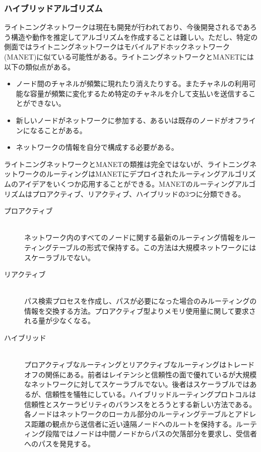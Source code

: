 \documentclass[12pt]{jarticle}
\begin{document}
\subsubsection{ハイブリッドアルゴリズム}
ライトニングネットワークは現在も開発が行われており、今後開発されるであろう構造や動作を推定してアルゴリズムを作成することは難しい。ただし、特定の側面ではライトニングネットワークはモバイルアドホックネットワーク(MANET)に似ている可能性がある。ライトニングネットワークとMANETには以下の類似点がある。
\begin{itemize}
\item ノード間のチャネルが頻繁に現れたり消えたりする。またチャネルの利用可能な容量が頻繁に変化するため特定のチャネルを介して支払いを送信することができない。
\item 新しいノードがネットワークに参加する、あるいは既存のノードがオフラインになることがある。
\item ネットワークの情報を自分で構成する必要がある。
\end{itemize}

ライトニングネットワークとMANETの類推は完全ではないが、ライトニングネットワークのルーティングはMANETにデプロイされたルーティングアルゴリズムのアイデアをいくつか応用することができる。MANETのルーティングアルゴリズムはプロアクティブ、リアクティブ、ハイブリッドの3つに分類できる\cite{MANET}。

\begin{description}
\item[プロアクティブ] \leavevmode \\
ネットワーク内のすべてのノードに関する最新のルーティング情報をルーティングテーブルの形式で保持する。この方法は大規模ネットワークにはスケーラブルでない。

\item[リアクティブ] \leavevmode \\
パス検索プロセスを作成し、パスが必要になった場合のみルーティングの情報を交換する方法。プロアクティブ型よりメモリ使用量に関して要求される量が少なくなる。

\item[ハイブリッド] \leavevmode \\
プロアクティブなルーティングとリアクティブなルーティングはトレードオフの関係にある。前者はレイテンシと信頼性の面で優れているが大規模なネットワークに対してスケーラブルでない。後者はスケーラブルではあるが、信頼性を犠牲にしている。ハイブリッドルーティングプロトコルは信頼性とスケーラビリティのバランスをとろうとする新しい方法である。
各ノードはネットワークのローカル部分のルーティングテーブルとアドレス距離の観点から送信者に近い遠隔ノードへのルートを保持する。ルーティング段階ではノードは中間ノードからパスの欠落部分を要求し、受信者へのパスを発見する。
\end{description}
\end{document}
